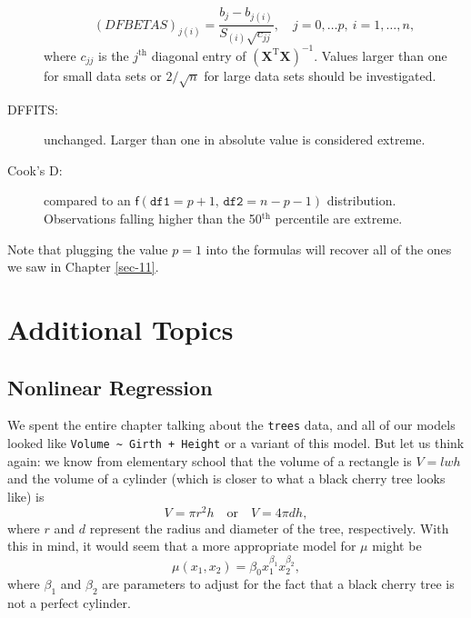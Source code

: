 \documentclass[captions=tableheading]{scrbook}
\begin{document}
\begin{description}
   \begin{equation}
   (DFBETAS)_{j(i)}=\frac{b_{j}-b_{j(i)}}{S_{(i)}\sqrt{c_{jj}}},\quad j=0,\ldots p,\ i=1,\ldots,n,
   \end{equation}
   where \(c_{jj}\) is the \(j^{\mathrm{th}}\) diagonal entry of \((\mathbf{X}^{\mathrm{T}}\mathbf{X})^{-1}\). Values larger than one for small data sets or \(2/\sqrt{n}\) for large data sets should be investigated.
\item[DFFITS:] unchanged. Larger than one in absolute value is considered extreme.
\item[Cook's D:] compared to an \(\mathsf{f}(\mathtt{df1}=p+1,\,\mathtt{df2}=n-p-1)\) distribution. Observations falling higher than the 50\(^{\textrm{th}}\) percentile are extreme.
\end{description}
Note that plugging the value \(p=1\) into the formulas will recover all of the ones we saw in Chapter \ref{sec-11}.
\section{Additional Topics}
\label{sec-12-9}
\label{sec-Additional-Topics-MLR}
\subsection{Nonlinear Regression}
\label{sec-12-9-1}


We spent the entire chapter talking about the \texttt{trees} data, and all of our models looked like \texttt{Volume \textasciitilde{} Girth + Height} or a variant of this model. But let us think again: we know from elementary school that the volume of a rectangle is \(V=lwh\) and the volume of a cylinder (which is closer to what a black cherry tree looks like) is
\begin{equation}
V=\pi r^{2}h\quad\mbox{or}\quad V=4\pi dh,
\end{equation}
where \(r\) and \(d\) represent the radius and diameter of the tree, respectively. With this in mind, it would seem that a more appropriate model for \(\mu\) might be
\begin{equation}
\mu(x_{1},x_{2})=\beta_{0}x_{1}^{\beta_{1}}x_{2}^{\beta_{2}},\label{eq-trees-nonlin-reg}
\end{equation}
where \(\beta_{1}\) and \(\beta_{2}\) are parameters to adjust for the fact that a black cherry tree is not a perfect cylinder.
\end{document}
